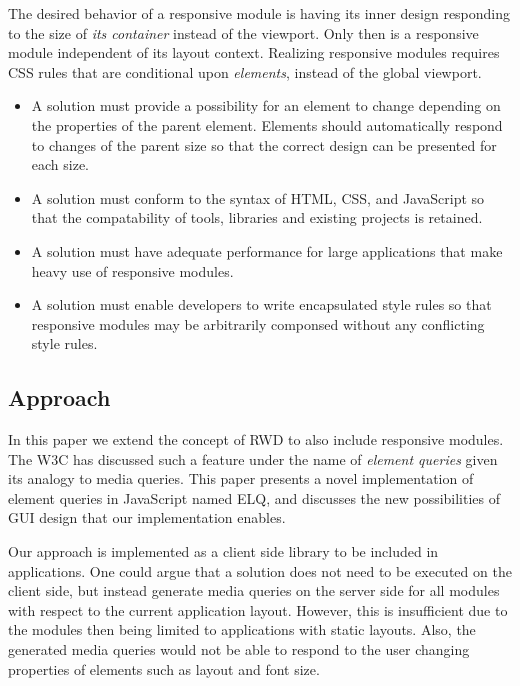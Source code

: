 \documentclass{acm_proc_article-sp}
\newcommand{\elq}{ELQ}
\begin{document}
      The desired behavior of a responsive module is having its inner design responding to the size of \emph{its container} instead of the viewport.
      Only then is a responsive module independent of its layout context.
      Realizing responsive modules requires CSS rules that are conditional upon \emph{elements}, instead of the global viewport.

      \begin{itemize}
        \item 
          A solution must provide a possibility for an element to change depending on the properties of the parent element.
          Elements should automatically respond to changes of the parent size so that the correct design can be presented for each size.
        \item
          A solution must conform to the syntax of HTML, CSS, and JavaScript so that the compatability of tools, libraries and existing projects is retained.
        \item
          A solution must have adequate performance for large applications that make heavy use of responsive modules.
        \item
          A solution must enable developers to write encapsulated style rules so that responsive modules may be arbitrarily componsed without any conflicting style rules.
      \end{itemize}

    \subsection{Approach}
      In this paper we extend the concept of RWD to also include responsive modules.
      The W3C has discussed such a feature under the name of \emph{element queries} given its analogy to media queries.
      This paper presents a novel implementation of element queries in JavaScript named \elq{}, and discusses the new possibilities of GUI design that our implementation enables.

      Our approach is implemented as a client side library to be included in applications.
      One could argue that a solution does not need to be executed on the client side, but instead generate media queries on the server side for all modules with respect to the current application layout.
      However, this is insufficient due to the modules then being limited to applications with static layouts.
      Also, the generated media queries would not be able to respond to the user changing properties of elements such as layout and font size.
\end{document}
